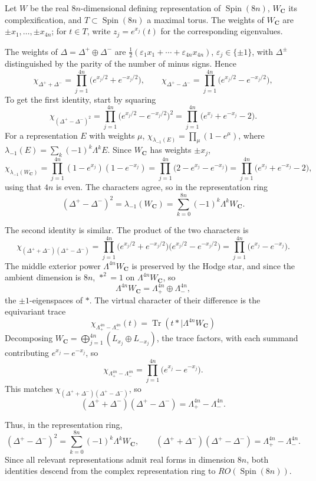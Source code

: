 \documentclass[12pt]{article}
\begin{document}
\begin{remark}
Let $W$ be the real $8n$-dimensional defining representation of $\operatorname{Spin}(8n)$,
$W_{\mathbf C}$ its complexification, and $T\subset\operatorname{Spin}(8n)$ a maximal
torus. The weights of $W_{\mathbf C}$ are $\pm x_1,\dots,\pm x_{4n}$; for $t\in T$, write
$z_j=e^{x_j}(t)$ for the corresponding eigenvalues.

The weights of $\Delta=\Delta^+\oplus\Delta^-$ are $\tfrac12(\varepsilon_1x_1+\cdots+
\varepsilon_{4n}x_{4n})$, $\varepsilon_j\in\{\pm1\}$, with $\Delta^\pm$ distinguished by
the parity of the number of minus signs. Hence
\[
\chi_{\Delta^++\Delta^-} = \prod_{j=1}^{4n}\big(e^{x_j/2}+e^{-x_j/2}\big),
\qquad
\chi_{\Delta^+-\Delta^-} = \prod_{j=1}^{4n}\big(e^{x_j/2}-e^{-x_j/2}\big),
\]
To get the first identity, start by squaring
\[
\chi_{(\Delta^+-\Delta^-)^2}
= \prod_{j=1}^{4n}\big(e^{x_j/2}-e^{-x_j/2}\big)^2
= \prod_{j=1}^{4n}\big(e^{x_j}+e^{-x_j}-2\big).
\]
For a representation $E$ with weights $\mu$, $\chi_{\lambda_{-1}(E)}=\prod_\mu(1-e^\mu)$,
where $\lambda_{-1}(E)=\sum_k(-1)^k\Lambda^kE$. Since $W_{\mathbf C}$ has weights $\pm x_j$,
\[
\chi_{\lambda_{-1}(W_{\mathbf C})}
= \prod_{j=1}^{4n}(1-e^{x_j})(1-e^{-x_j})
= \prod_{j=1}^{4n}\big(2-e^{x_j}-e^{-x_j}\big)
= \prod_{j=1}^{4n}\big(e^{x_j}+e^{-x_j}-2\big),
\]
using that $4n$ is even. The characters agree, so in the representation ring
\[
(\Delta^+-\Delta^-)^2 = \lambda_{-1}(W_{\mathbf C}) = \sum_{k=0}^{8n}(-1)^k\Lambda^kW_{\mathbf C}.
\]

The second identity is similar. The product of the two characters is
\[
\chi_{(\Delta^++\Delta^-)(\Delta^+-\Delta^-)}
= \prod_{j=1}^{4n}\big(e^{x_j/2}+e^{-x_j/2}\big)\big(e^{x_j/2}-e^{-x_j/2}\big)
= \prod_{j=1}^{4n}\big(e^{x_j}-e^{-x_j}\big).
\]
The middle exterior power $\Lambda^{4n}W_{\mathbf C}$ is preserved by the Hodge star, and
since the ambient dimension is $8n$, $*^2=1$ on $\Lambda^{4n}W_{\mathbf C}$, so
\[
\Lambda^{4n}W_{\mathbf C} = \Lambda^{4n}_+\oplus\Lambda^{4n}_-,
\]
the $\pm1$-eigenspaces of $*$. The virtual character of their difference is the
equivariant trace \[\chi_{\Lambda^{4n}_+-\Lambda^{4n}_-}(t) = \operatorname{Tr}(t*\mid
\Lambda^{4n}W_{\mathbf C})\] Decomposing $W_{\mathbf C}=\bigoplus_{j=1}^{4n}(L_{x_j}\oplus
L_{-x_j})$, the trace factors, with each summand contributing $e^{x_j}-e^{-x_j}$, so
\[
\chi_{\Lambda^{4n}_+-\Lambda^{4n}_-} = \prod_{j=1}^{4n}\big(e^{x_j}-e^{-x_j}\big).
\]
This matches $\chi_{(\Delta^++\Delta^-)(\Delta^+-\Delta^-)}$, so
\[
(\Delta^++\Delta^-)(\Delta^+-\Delta^-) = \Lambda^{4n}_+-\Lambda^{4n}_-.
\]

Thus, in the representation ring,
\[
(\Delta^+-\Delta^-)^2 = \sum_{k=0}^{8n}(-1)^k\Lambda^kW_{\mathbf C},
\qquad
(\Delta^++\Delta^-)(\Delta^+-\Delta^-) = \Lambda^{4n}_+-\Lambda^{4n}_-.
\]
Since all relevant representations admit real forms in dimension $8n$, both identities
descend from the complex representation ring to $RO(\operatorname{Spin}(8n))$.
\end{remark}
\end{document}
